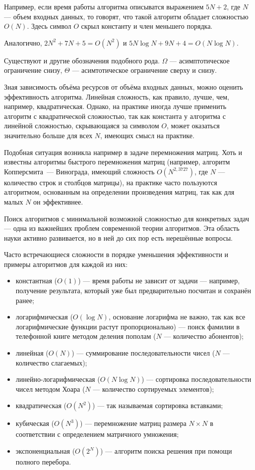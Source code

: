 Например, если время работы алгоритма описыватся выражением $5N+2$,
где $N$ — объем входных данных, то говорят, что такой алгоритм
обладает сложностью $O(N)$. Здесь символ $O$ скрыл константу и член
меньшего порядка.

Аналогично, $2N^2+7N+5 = O(N^2)$ и $5N\log N + 9N + 4 = O(N\log N)$.

Существуют и другие обозначения подобного рода. $\Omega$ —
асимптотическое ограничение снизу, $\Theta$ — асимтотическое
ограничение сверху и снизу.

Зная зависимость объёма ресурсов от объёма входных данных, можно
оценить эффективность алгоритма. Линейная сложность, как правило,
лучше, чем, например, квадратическая.  Однако, на практике иногда
лучше применить алгоритм с квадратической сложностью, так как
константа у алгоритма с линейной сложностью, скрывающаяся за символом
$O$, может оказаться значительно больше для всех $N$, имеющих смысл на
практике.

Подобная ситуация возникла например в задаче перемножения матриц. Хоть
и известны алгоритмы быстрого перемножения матриц (например, алгоритм
Копперсмита~— Винограда, имеющий сложность $O(N^{2{,}3727})$, где $N$
— количество строк и столбцов матрицы), на практике часто пользуются
алгоритмом, основанным на определении произведения матриц, так как для
малых $N$ он эффективнее.

Поиск алгоритмов с минимальной возможной сложностью для конкретных
задач — одна из важнейших проблем современной теории алгоритмов. Эта
область науки активно развивается, но в ней до сих пор есть нерешённые
вопросы.

Часто встречающиеся сложности в порядке уменьшения эффективности и
примеры алгоритмов для каждой из них:

\begin{itemize}
\item константная ($O(1)$) — время работы не зависит от задачи —
  например, получение результата, который уже был предварительно
  посчитан и сохранён ранее;
\item логарифмическая ($O(\log N)$, основание логарифма не важно, так
  как все логарифмические функции растут пропорционально) — поиск
  фамилии в телефонной книге методом деления пополам ($N$ — количество
  абонентов);
\item линейная ($O(N)$) — суммирование последовательности чисел ($N$ —
  количество слагаемых);
\item линейно-логарифмическая ($O(N\log N)$) — сортировка
  последовательности чисел методом Хоара ($N$ — количество сортируемых
  элементов);
\item квадратическая ($O(N^{2})$) — так называемая сортировка вставками;
\item кубическая ($O(N^{3})$) — перемножение матриц размера $N\times
  N$ в соответствии с определением матричного умножения;
\item экспоненциальная ($O(2^{N})$) — алгоритм поиска решения при
  помощи полного перебора.
\end{itemize}

